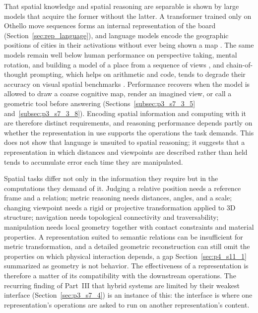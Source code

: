 That spatial knowledge and spatial reasoning are separable is shown by large models that acquire the former without the latter.
A transformer trained only on Othello move sequences forms an internal representation of the board (Section~\ref{sec:rep_language}), and language models encode the geographic positions of cities in their activations without ever being shown a map \cite{gurnee2023language}.
The same models remain well below human performance on perspective taking, mental rotation, and building a model of a place from a sequence of views \cite{cai2025holistic}, and chain-of-thought prompting, which helps on arithmetic and code, tends to degrade their accuracy on visual spatial benchmarks \cite{kancheti2026cotdegrades}.
Performance recovers when the model is allowed to draw a coarse cognitive map, render an imagined view, or call a geometric tool before answering (Sections~\ref{subsec:p3_s7_3_5} and~\ref{subsec:p3_s7_3_8}).
Encoding spatial information and computing with it are therefore distinct requirements, and reasoning performance depends partly on whether the representation in use supports the operations the task demands.
This does not show that language is unsuited to spatial reasoning; it suggests that a representation in which distances and viewpoints are described rather than held tends to accumulate error each time they are manipulated.

Spatial tasks differ not only in the information they require but in the computations they demand of it.
Judging a relative position needs a reference frame and a relation; metric reasoning needs distances, angles, and a scale; changing viewpoint needs a rigid or projective transformation applied to 3D structure; navigation needs topological connectivity and traversability; manipulation needs local geometry together with contact constraints and material properties.
A representation suited to semantic relations can be insufficient for metric transformation, and a detailed geometric reconstruction can still omit the properties on which physical interaction depends, a gap Section~\ref{sec:p4_s11_1} summarized as geometry is not behavior.
The effectiveness of a representation is therefore a matter of its compatibility with the downstream operations.
The recurring finding of Part~III that hybrid systems are limited by their weakest interface (Section~\ref{sec:p3_s7_4}) is an instance of this: the interface is where one representation's operations are asked to run on another representation's content.

